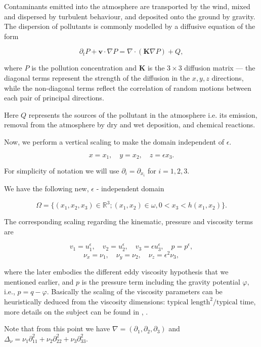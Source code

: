 \documentclass[11pt]{article}
\begin{document}
Contaminants emitted into the atmosphere are transported by the wind, mixed and dispersed by turbulent behaviour, and deposited onto the ground by gravity. The dispersion of pollutants is commonly modelled by a diffusive equation of the form
    
\begin{equation} \label{diffusive}
  \partial_t P + \mathbf{v} \cdot \nabla P = \nabla \cdot (\mathbf{K} \nabla P) + Q,
\end{equation}

where $P$ is the pollution concentration and $\mathbf{K}$ is the $3 \times 3$ diffusion matrix --- the diagonal terms represent the strength of the diffusion in the $x, y, z$ directions, while the non-diagonal terms reflect the correlation of random motions between each pair of principal directions.

Here $Q$ represents the sources of the pollutant in the atmosphere i.e. its emission, removal from the atmosphere by dry and wet deposition, and chemical reactions.
    
Now, we perform a vertical scaling to make the domain independent of $\epsilon.$

    \[x=x_1, \quad y=x_2, \quad z=\epsilon x_3. \]
    
    For simplicity of notation we will use $\partial_i = \partial_{x_i} $ for $i = 1,2,3.$
    
    We have the following new, $\epsilon$ - independent domain
    
    \[ \Omega =  \{(x_1,x_2,x_3) \in \mathbb{R}^3 ; (x_1,x_2) \in \omega, 0 < x_3 < h (x_1 , x_2) \}.\]
    
     The corresponding scaling regarding the kinematic, pressure and viscosity terms are
     
    \[v_1 = u_1^{\epsilon}, \quad v_2 = u_2^{\epsilon}, \quad v_3 = \epsilon u_3^{\epsilon}, \quad p = p^{\epsilon}, \]
    \[\nu_x = \nu_1, \quad \nu_y = \nu_2 , \quad \nu_z = \epsilon ^ 2\nu_3, \]
    
    where the later embodies the different eddy viscosity hypothesis that we mentioned earlier, and $p$ is the pressure term including the gravity potential $\varphi,$ i.e., $p = q - \varphi$. Basically the scaling of the viscosity parameters can be heuristically deduced from the viscosity dimensions: $\text{typical length}^2 / \text{typical time}$, more details on the subject can be found in \cite{besson1992some}, \cite{azerad2001mathematical}.
    
    Note that from this point we have $\nabla = (\partial_1, \partial_2, \partial_3) $ and $ \Delta_\nu = \nu_1 \partial^2_{11} + \nu_2 \partial^2_{22}  + \nu_3 \partial^2_{33} $. 
    
\end{document}
